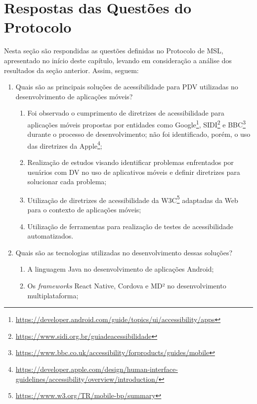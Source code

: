 \section{Respostas das Questões do Protocolo}

Nesta seção são respondidas as questões definidas no Protocolo de MSL, apresentado no início deste capítulo, levando em consideração a análise dos resultados da seção anterior.
Assim, seguem:

\begin{enumerate}
      \item Quais são as principais soluções de acessibilidade para PDV utilizadas
            no desenvolvimento de aplicações móveis?
            \begin{enumerate}
                  \item Foi observado o cumprimento de diretrizes de acessibilidade para aplicações móveis propostas por entidades
                        como Google\footnote{\url{https://developer.android.com/guide/topics/ui/accessibility/apps}},
                        SIDI\footnote{\url{https://www.sidi.org.br/guiadeacessibilidade}} e
                        BBC\footnote{\url{https://www.bbc.co.uk/accessibility/forproducts/guides/mobile}}
                        durante o processo de desenvolvimento; não foi identificado, porém, o uso das diretrizes da
                        Apple\footnote{\url{https://developer.apple.com/design/human-interface-guidelines/accessibility/overview/introduction/}};
                  \item Realização de estudos visando identificar problemas enfrentados por usuários com DV no uso de aplicativos móveis e definir diretrizes para solucionar cada problema;
                  \item Utilização de diretrizes de acessibilidade da W3C\footnote{\url{https://www.w3.org/TR/mobile-bp/summary}} adaptadas da Web para o contexto de aplicações móveis;
                  \item Utilização de ferramentas para realização de testes de acessibilidade automatizados.
            \end{enumerate}
      \item Quais são as tecnologias utilizadas no desenvolvimento dessas soluções?
            \begin{enumerate}
                  \item A linguagem Java no desenvolvimento de aplicações Android;
                  \item Os \emph{frameworks} React Native, Cordova e MD² no desenvolvimento multiplataforma;

\end{enumerate}
\end{enumerate}
